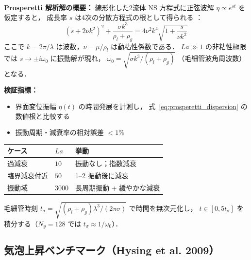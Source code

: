 \textbf{Prosperetti 解析解の概要：}
線形化した2流体 NS 方程式に正弦波解 $\eta \propto e^{st}$ を仮定すると，
成長率 $s$ は4次の分散方程式の根として得られる \cite{Prosperetti1981}：
\begin{equation}
  \left(s + 2\nu k^2\right)^2 \!+ \frac{\sigma k^3}{\rho_l + \rho_g}
  = 4\nu^2 k^4 \sqrt{1 + \frac{s}{\nu k^2}}
  \label{eq:prosperetti_dispersion}
\end{equation}
ここで $k = 2\pi/\lambda$ は波数，$\nu = \mu/\rho_l$ は動粘性係数である．
$La \gg 1$ の非粘性極限では $s \to \pm i\omega_0$ に振動解が現れ，
$\omega_0 = \sqrt{\sigma k^3 / (\rho_l + \rho_g)}$ （毛細管波角周波数）となる．

\textbf{検証指標：}
\begin{itemize}
  \item 界面変位振幅 $\eta(t)$ の時間発展を計測し，
        式~\eqref{eq:prosperetti_dispersion} の数値根と比較する
  \item 振動周期・減衰率の相対誤差 $< 1\%$
\end{itemize}

\begin{tcolorbox}[mybox, title={参照パラメータ（Harvie \& Fletcher 2000 より）}]
\begin{center}
\renewcommand{\arraystretch}{1.2}
\begin{tabular}{lll}
\hline
ケース & $La$ & 挙動 \\
\hline
過減衰 & $10$ & 振動なし；指数減衰 \\
臨界減衰付近 & $50$ & 1--2 振動後に減衰 \\
振動域 & $3000$ & 長周期振動 + 緩やかな減衰 \\
\hline
\end{tabular}
\end{center}

毛細管時刻 $t_\sigma = \sqrt{(\rho_l+\rho_g)\lambda^3 / (2\pi\sigma)}$ で時間を無次元化し，
$t \in [0, 5 t_\sigma]$ を積分する（$N_y = 128$ では $t_\sigma \approx 1/\omega_0$）．
\end{tcolorbox}

\subsection{気泡上昇ベンチマーク（Hysing et al. 2009）}
\label{sec:val_rising_bubble}
\label{sec:bench_bubble}

